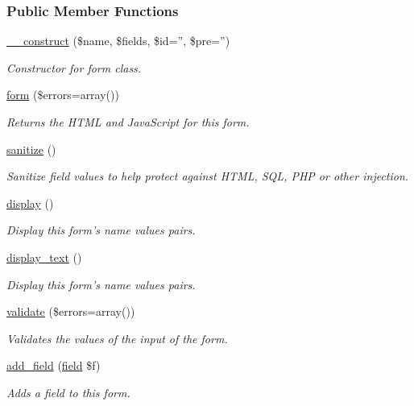 \subsubsection*{Public Member Functions}
\begin{DoxyCompactItemize}
\item 
\hyperlink{classforms_aa6f51d92d0245300fccd3539816c5bf2}{\-\_\-\-\_\-construct} (\$name, \$fields, \$id='', \$pre='')
\begin{DoxyCompactList}\small\item\em Constructor for form class. \end{DoxyCompactList}\item 
\hyperlink{classforms_aca4fdeecf56bc5796f628a477f9ce629}{form} (\$errors=array())
\begin{DoxyCompactList}\small\item\em Returns the H\-T\-M\-L and Java\-Script for this form. \end{DoxyCompactList}\item 
\hyperlink{classforms_a2494aca1309491b0ba423e233f4210b3}{sanitize} ()
\begin{DoxyCompactList}\small\item\em Sanitize field values to help protect against H\-T\-M\-L, S\-Q\-L, P\-H\-P or other injection. \end{DoxyCompactList}\item 
\hyperlink{classforms_abbb54cc0731f483777e6baa39f9fe494}{display} ()
\begin{DoxyCompactList}\small\item\em Display this form's name values pairs. \end{DoxyCompactList}\item 
\hyperlink{classforms_ad78a6f47ecded8987dda90468dbb8f77}{display\-\_\-text} ()
\begin{DoxyCompactList}\small\item\em Display this form's name values pairs. \end{DoxyCompactList}\item 
\hyperlink{classforms_a80d7d5c6d738b6f42cfbb258b3c3a3d1}{validate} (\$errors=array())
\begin{DoxyCompactList}\small\item\em Validates the values of the input of the form. \end{DoxyCompactList}\item 
\hyperlink{classforms_ad85afb257cfdcf8834590774fd9ef357}{add\-\_\-field} (\hyperlink{interfacefield}{field} \$f)
\begin{DoxyCompactList}\small\item\em Adds a field to this form. \end{DoxyCompactList}\item 

\end{DoxyCompactItemize}
